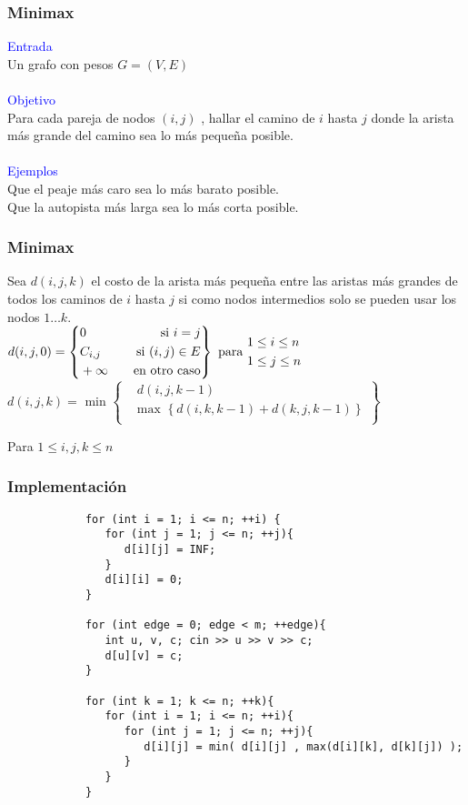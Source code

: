 \documentclass{beamer}
\begin{document}
	\begin{frame}
		\frametitle{Minimax}
		\textcolor{blue}{\large Entrada}\\
		Un grafo con pesos $G = (V, E)$ \\ \quad \\
		\textcolor{blue}{\large Objetivo}\\
		Para cada pareja de nodos $(i, j)$ , hallar el camino de $i$ hasta $j$ donde la arista más grande del camino sea lo más pequeña posible.\\ \quad \\
		\textcolor{blue}{\large Ejemplos}\\
		Que el peaje más caro sea lo más barato posible.\\
		Que la autopista más larga sea lo más corta posible.
	\end{frame}
	
	\begin{frame}
		\frametitle{Minimax}
		Sea $d(i, j, k)$ el costo de la arista más pequeña entre las aristas más grandes de todos los caminos de $i$ hasta $j$ si como nodos intermedios solo se pueden usar los nodos $1 \ldots k$. \\
		\vfill
		$d(i, j, 0) =
		\left\{
			\begin{aligned}
				& 0       &\text{\quad si } i = j\\
				& C_{i,j} &\text{\quad si } (i, j) \in E\\
				& +\infty &\text{\quad en otro caso}
			\end{aligned}
		\right\}
		\text{ para } 
			\begin{aligned}
				& 1 \leq i \leq n\\
				& 1 \leq j \leq n\\
			\end{aligned}
		$
		\vfill
		$d(i, j, k) = \text{ min }
		\left\{
			\begin{aligned}
				& d(i, j, k-1)\\
				& \text{max }\left\{ d(i, k, k-1) + d(k, j, k-1) \right\}\\
			\end{aligned}
		\right\}
		$
		\\ \begin{center} Para $ 1 \leq i, j, k \leq n$ \end{center}
	\end{frame}
	
	\begin{frame}[fragile]
		\frametitle{Implementación}
		\begin{lstlisting}
			for (int i = 1; i <= n; ++i) {
			   for (int j = 1; j <= n; ++j){
			      d[i][j] = INF;
			   }
			   d[i][i] = 0;
			}

			for (int edge = 0; edge < m; ++edge){
			   int u, v, c; cin >> u >> v >> c;
			   d[u][v] = c;
			}
			
			for (int k = 1; k <= n; ++k){
			   for (int i = 1; i <= n; ++i){
			      for (int j = 1; j <= n; ++j){
			         d[i][j] = min( d[i][j] , max(d[i][k], d[k][j]) );
			      }
			   }
			}
		\end{lstlisting}
	\end{frame}
	
\end{document}
